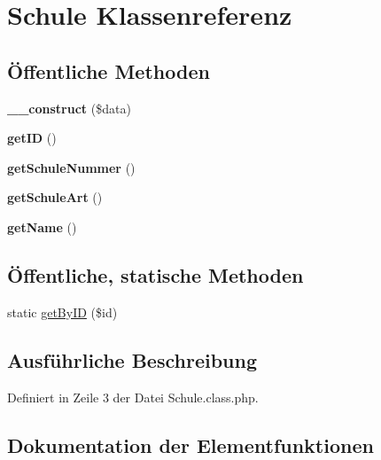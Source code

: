 \hypertarget{class_schule}{}\section{Schule Klassenreferenz}
\label{class_schule}
\subsection*{Öffentliche Methoden}
\begin{DoxyCompactItemize}
\item 
\mbox{\label{class_schule_a14afcf64b663041535de9509f93b237c}} 
{\bfseries \+\_\+\+\_\+construct} (\$data)
\item 
\mbox{\label{class_schule_a43987b0bb13c5d3c6bbd6f1b6e3efc71}} 
{\bfseries get\+ID} ()
\item 
\mbox{\label{class_schule_a50c5481ccfb34c345b0420377353ae24}} 
{\bfseries get\+Schule\+Nummer} ()
\item 
\mbox{\label{class_schule_ae97bd58d9e56555df06eecd8b93310d5}} 
{\bfseries get\+Schule\+Art} ()
\item 
\mbox{\label{class_schule_a4698f23c3ef3be24f99e48809273d123}} 
{\bfseries get\+Name} ()
\end{DoxyCompactItemize}
\subsection*{Öffentliche, statische Methoden}
\begin{DoxyCompactItemize}
\item 
static \mbox{\hyperlink{class_schule_aa2a0f10df18dc03791276963ed4dd49e}{get\+By\+ID}} (\$id)
\end{DoxyCompactItemize}


\subsection{Ausführliche Beschreibung}


Definiert in Zeile 3 der Datei Schule.\+class.\+php.



\subsection{Dokumentation der Elementfunktionen}
\mbox{\label{class_schule_aa2a0f10df18dc03791276963ed4dd49e}} 
